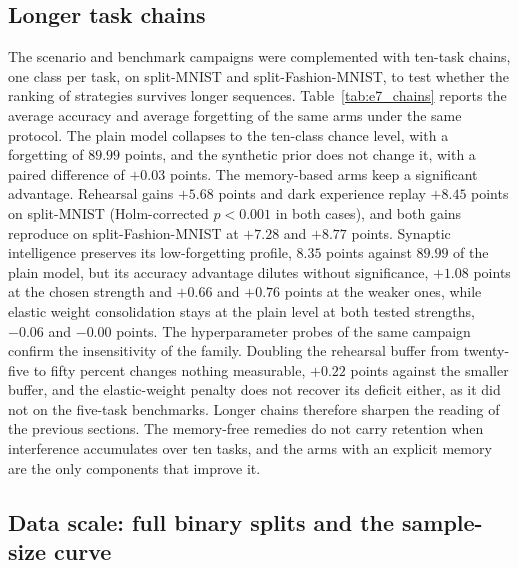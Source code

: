 \documentclass[preprint,number,sort&compress]{elsarticle}
\begin{document}
\subsection{Longer task chains}
\label{sec:longer_chains}

The scenario and benchmark campaigns were complemented with ten-task chains, one class per
task, on split-MNIST and split-Fashion-MNIST, to test whether the ranking of strategies
survives longer sequences. Table~\ref{tab:e7_chains} reports the average accuracy and
average forgetting of the same arms under the same protocol. The plain model collapses to
the ten-class chance level, with a forgetting of $89.99$ points, and the synthetic prior
does not change it, with a paired difference of $+0.03$ points. The memory-based arms keep
a significant advantage. Rehearsal gains $+5.68$ points and dark experience replay $+8.45$
points on split-MNIST (Holm-corrected $p < 0.001$ in both cases), and both gains reproduce
on split-Fashion-MNIST at $+7.28$ and $+8.77$ points. Synaptic intelligence preserves its
low-forgetting profile, $8.35$ points against $89.99$ of the plain model, but its accuracy
advantage dilutes without significance, $+1.08$ points at the chosen strength and $+0.66$
and $+0.76$ points at the weaker ones, while elastic weight consolidation stays at the
plain level at both tested strengths, $ -0.06$ and $-0.00$ points. The hyperparameter
probes of the same campaign confirm the insensitivity of the family. Doubling the rehearsal
buffer from twenty-five to fifty percent changes nothing measurable, $+0.22$ points against
the smaller buffer, and the elastic-weight penalty does not recover its deficit either, as
it did not on the five-task benchmarks. Longer chains therefore sharpen the reading of the
previous sections. The memory-free remedies do not carry retention when interference
accumulates over ten tasks, and the arms with an explicit memory are the only components
that improve it.



\subsection{Data scale: full binary splits and the sample-size curve}
\label{sec:exp_scale}
\end{document}
